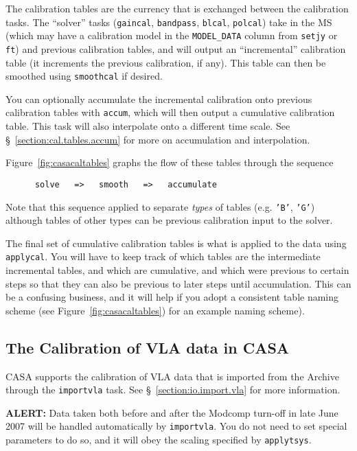 The calibration tables are the currency that is exchanged between
the calibration tasks.  The ``solver'' tasks ({\tt gaincal},
{\tt bandpass}, {\tt blcal}, {\tt polcal}) take in the MS
(which may have a calibration model in the {\tt MODEL\_DATA}
column from {\tt setjy} or {\tt ft}) and previous calibration
tables, and will output an ``incremental'' calibration table
(it increments the previous calibration, if any).  This table
can then be smoothed using {\tt smoothcal} if desired.

You can optionally accumulate the incremental calibration onto
previous calibration tables with {\tt accum}, which will then output a
cumulative calibration table.  This task will also interpolate onto a
different time scale.  See \S~\ref{section:cal.tables.accum} for more
on accumulation and interpolation.

Figure~\ref{fig:casacaltables} graphs the flow of these tables
through the sequence
\small
\begin{verbatim}
      solve   =>   smooth   =>   accumulate
\end{verbatim}
\normalsize
Note that this sequence applied to separate {\em types} of tables
(e.g. {\tt 'B'}, {\tt 'G'}) although tables of other types can
be previous calibration input to the solver.

The final set of cumulative calibration tables is what is applied
to the data using {\tt applycal}.  You will have to keep track of
which tables are the intermediate incremental tables, and which
are cumulative, and which were previous to certain steps so that
they can also be previous to later steps until accumulation.  This
can be a confusing business, and it will help if you adopt a
consistent table naming scheme (see Figure~\ref{fig:casacaltables})
for an example naming scheme).


\subsection{The Calibration of VLA data in CASA}
\label{section:cal.flow.vla}

CASA supports the calibration of VLA data that is 
imported from the Archive through the {\tt importvla} task.
See \S~\ref{section:io.import.vla} for more information.

{\bf ALERT:} Data taken both before and after the Modcomp turn-off in
late June 2007 will be handled automatically by {\tt importvla}.  You
do not need to set special parameters to do so, and it will obey the
scaling specified by {\tt applytsys}.

